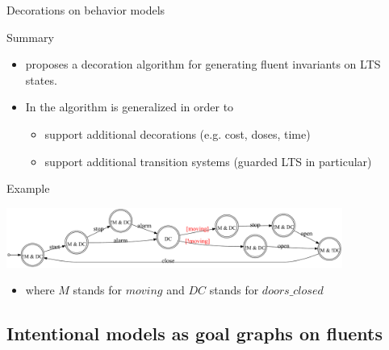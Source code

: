 \begin{frame}{Decorations on behavior models}
	\begin{block}{Summary}
		\begin{itemize}
			\item \cite{Damas05} proposes a decoration algorithm for generating fluent invariants on LTS states.
			\item In \cite{Damas10} the algorithm is generalized in order to 
				\begin{itemize}
					\item support additional decorations (e.g. cost, doses, time)
					\item support additional transition systems (guarded LTS in particular)
				\end{itemize}
		\end{itemize}
	\end{block}	
	\begin{block}{Example}
		\begin{center} 
			\includegraphics[width=11cm]{images/Train_guarded_LTS_decorated.pdf}
		\end{center}
		\vspace{-0.5cm}
		\begin{itemize}
			\item where $M$ stands for $moving$ and $DC$ stands for $doors\_closed$
		\end{itemize}
	\end{block}
\end{frame}

\subsection{Intentional models as goal graphs on fluents}

